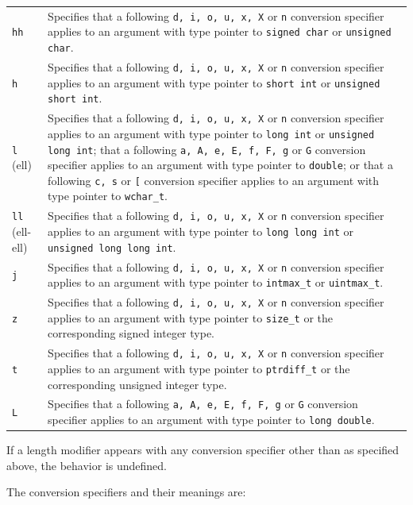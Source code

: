 \begin{longtable}{p{}p{}}
\texttt{hh}&Specifies that a following \texttt{d, i, o, u, x, X} or \texttt{n}
conversion specifier applies to an argument with type pointer to \texttt{signed
  char} or \texttt{unsigned char}.\\
\texttt{h}&Specifies that a following \texttt{d, i, o, u, x, X} or \texttt{n}
conversion specifier applies to an argument with type pointer to \texttt{short
  int} or \texttt{unsigned short int}.\\
\texttt{l} (ell)&Specifies that a following \texttt{d, i, o, u, x, X} or
\texttt{n} conversion specifier applies to an argument with type pointer to
\texttt{long int} or \texttt{unsigned long int}; that a following \texttt{a, A,
  e, E, f, F, g} or \texttt{G} conversion specifier applies to an argument with
type pointer to \texttt{double}; or that a following \texttt{c, s} or
\texttt{[} conversion specifier applies to an argument with type pointer to
\texttt{wchar\_t}.\\
\texttt{ll} (ell-ell)&Specifies that a following \texttt{d, i, o, u, x, X} or
\texttt{n} conversion specifier applies to an argument with type pointer to
\texttt{long long int} or \texttt{unsigned long long int}.\\
\texttt{j}&Specifies that a following \texttt{d, i, o, u, x, X} or \texttt{n}
conversion specifier applies to an argument with type pointer to
\texttt{intmax\_t} or \texttt{uintmax\_t}.\\
\texttt{z}&Specifies that a following \texttt{d, i, o, u, x, X} or \texttt{n}
conversion specifier applies to an argument with type pointer to
\texttt{size\_t} or the corresponding signed integer type.\\
\texttt{t}&Specifies that a following \texttt{d, i, o, u, x, X} or \texttt{n}
conversion specifier applies to an argument with type pointer to
\texttt{ptrdiff\_t} or the corresponding unsigned integer type.\\
\texttt{L}&Specifies that a following \texttt{a, A, e, E, f, F, g} or
\texttt{G} conversion specifier applies to an argument with type pointer to
\texttt{long double}.
\end{longtable}

If a length modifier appears with any conversion specifier other than as
specified above, the behavior is undefined.

The conversion specifiers and their meanings are:

